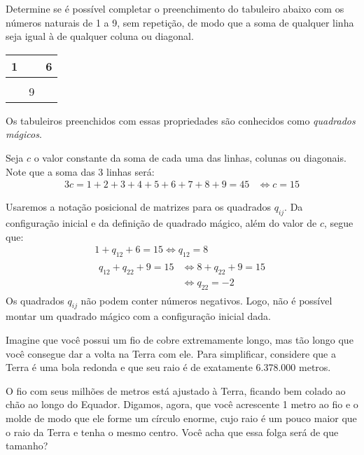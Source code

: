 \begin{example}
\label{ex:quadrado-magico-3x3}
Determine se é possível completar o preenchimento do tabuleiro abaixo com os números naturais de 1 a 9, sem repetição, de modo que a soma de qualquer linha seja igual à de qualquer coluna ou diagonal.

\begin{center}
\begin{tabular}{|c|c|c|}
	\hline
	1 &   & 6 \\ \hline
		&   &   \\ \hline
		& 9 &   \\
	\hline
\end{tabular}
\end{center}
Os tabuleiros preenchidos com essas propriedades são conhecidos como \emph{quadrados mágicos}.
\end{example}

\begin{solution}
Seja $c$ o valor constante da soma de cada uma das linhas, colunas ou diagonais. Note que a soma das 3 linhas será:
%
\begin{align*}
3c = 1+2+3+4+5+6+7+8+9=45 & \iff c =15
\end{align*}

Usaremos a notação posicional de matrizes para os quadrados $q_{ij}$. Da configuração inicial e da definição de quadrado mágico, além do valor de $c$, segue que:
%
\begin{gather*}
		1+q_{12}+6=15  \iff q_{12} = 8 \\
		\begin{aligned}
						q_{12} + q_{22} + 9= 15 & \iff 8+q_{22} + 9= 15\\
						& \iff q_{22} = -2
		\end{aligned}
\end{gather*}
%
\noindent Os quadrados $q_{ij}$ não podem conter números negativos. Logo, não é possível montar um quadrado mágico com a configuração inicial dada.
\end{solution}

\begin{example}
\label{ex:fio-terra}
Imagine que você possui um fio de cobre extremamente longo, mas tão longo que você consegue dar a volta na Terra com ele. Para simplificar, considere que a Terra é uma bola redonda e que seu raio é de exatamente 6.378.000 metros.

O fio com seus milhões de metros está ajustado à Terra, ficando bem colado ao chão ao longo do Equador. Digamos, agora, que você acrescente 1 metro ao fio e o molde de modo que ele forme um círculo enorme, cujo raio é um pouco maior que o raio da Terra e tenha o mesmo centro. Você acha que essa folga será de que tamanho?
\end{example}

